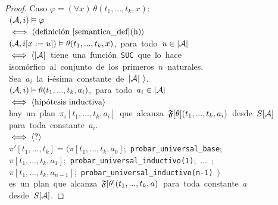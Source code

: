 \begin{proof}
\noindent Caso $\varphi = (\forall x)\ \theta(t_1,...,t_k,x):$\\
\mbox{\hspace{10mm} $(\mathcal{A}, i) \vDash \varphi$}\\
\mbox{\hspace{5mm} $\iff \langle \text{definición \ref{semantica_def}(h)} \rangle$}\\
\mbox{\hspace{10mm} $(\mathcal{A}, i[x:=u]) \vDash \theta(t_1,...,t_k,x)$, para todo $u\in|\mathcal{A}|$}\\
\mbox{\hspace{5mm} $\iff \langle |\mathcal{A}|$ tiene una función \texttt{SUC} que lo
hace}\\
\mbox{\hspace{15mm} isomórfico al conjunto de los primeros $n$ naturales.}\\
\mbox{\hspace{15mm} Sea $a_i$ la i-ésima constante de $|\mathcal{A}| \ \rangle$.}\\
\mbox{\hspace{10mm} $(\mathcal{A}, i) \vDash \theta(t_1,...,t_k,a_i)$, para todo $a_i
\in |\mathcal{A}|$}\\
\mbox{\hspace{5mm} $\iff \langle \text{hipótesis inductiva} \rangle$}\\
\mbox{\hspace{10mm} hay un plan $\pi_i[t_1,...,t_k,a_i]$ que alcanza
$\mathfrak{F}[\theta](t_1,...,t_k,a_i)$ desde $S[\mathcal{A}]$}\\
\mbox{\hspace{10mm} para toda constante $a_i$.}\\
\mbox{\hspace{5mm} $\iff \langle \text{?} \rangle$}\\
\mbox{\hspace{10mm} $\pi'[t_1,...,t_k] =
\langle \pi[t_1,...,t_k,a_0]$;\ \texttt{probar\_universal\_base};}\\
\mbox{\hspace{10mm}
$\pi[t_1,...,t_k,a_1]$;\ \texttt{probar\_universal\_inductivo(1)};\ ...\ ;}\\
\mbox{\hspace{10mm} $\pi[t_1,...,t_k,a_{n-1}]$;\
\texttt{probar\_universal\_inductivo(n-1)} $\rangle$}\\
\mbox{\hspace{10mm} es un plan que alcanza $\mathfrak{F}[\theta](t_1,...,t_k,a)$ para
toda constante $a$}\\
\mbox{\hspace{10mm} desde $S[\mathcal{A}]$.}
\end{proof}

